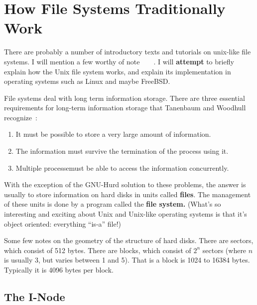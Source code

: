 \documentclass{article}
\begin{document}
\section{How File Systems Traditionally Work}

There are probably a number of introductory texts and tutorials on unix-like file systems. I will mention a few worthy of note~\cite{skelix}~\cite{minixbook}~\cite{bsdbook}~\cite{linuxbook}. I will \textbf{attempt} to briefly explain how the Unix file system works, and explain its implementation in operating systems such as Linux and maybe FreeBSD.

File systems deal with long term information storage. There are three essential requirements for long-term information storage that Tanenbaum and Woodhull recognize~\cite{minixbook}:
\begin{enumerate}
 \item It must be possible to store a very large amount of information.
 \item The information must survive the termination of the process using it.
 \item Multiple processemust be able to access the information concurrently.
\end{enumerate}
With the exception of the GNU-Hurd solution to these problems, the answer is usually to store information on hard disks in units called \textbf{files}. The management of these units is done by a program called the \textbf{file system.} (What's so interesting and exciting about Unix and Unix-like operating systems is that it's object oriented: everything ``is-a'' file!)

Some few notes on the geometry of the structure of hard disks. There are sectors, which consist of 512 bytes. There are blocks, which consist of $2^{n}$ sectors (where $n$ is usually 3, but varies between 1 and 5). That is a block is 1024 to 16384 bytes. Typically it is 4096 bytes per block.

\subsection{The I-Node}
\end{document}
